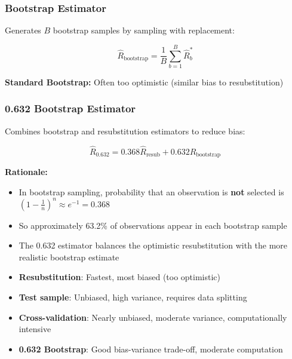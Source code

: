\documentclass[12pt,a4paper]{article}
\begin{document}
\subsubsection{Bootstrap Estimator}

Generates $B$ bootstrap samples by sampling with replacement:

\begin{equation}
\hat{R}_{\text{bootstrap}} = \frac{1}{B} \sum_{b=1}^B \hat{R}_b^*
\end{equation}

\textbf{Standard Bootstrap:} Often too optimistic (similar bias to resubstitution)

\subsubsection{0.632 Bootstrap Estimator}

Combines bootstrap and resubstitution estimators to reduce bias:

\begin{equation}
\hat{R}_{0.632} = 0.368 \hat{R}_{\text{resub}} + 0.632 \hat{R}_{\text{bootstrap}}
\end{equation}

\textbf{Rationale:}
\begin{itemize}
    \item In bootstrap sampling, probability that an observation is \textbf{not} selected is $(1-\frac{1}{n})^n \approx e^{-1} = 0.368$
    \item So approximately 63.2\% of observations appear in each bootstrap sample
    \item The 0.632 estimator balances the optimistic resubstitution with the more realistic bootstrap estimate
\end{itemize}

\begin{tcolorbox}[colback=red!5!white,colframe=red!75!black,title=Comparison of Error Estimators]
\begin{itemize}
    \item \textbf{Resubstitution}: Fastest, most biased (too optimistic)
    \item \textbf{Test sample}: Unbiased, high variance, requires data splitting  
    \item \textbf{Cross-validation}: Nearly unbiased, moderate variance, computationally intensive
    \item \textbf{0.632 Bootstrap}: Good bias-variance trade-off, moderate computation
\end{itemize}
\end{tcolorbox}
\end{document}
